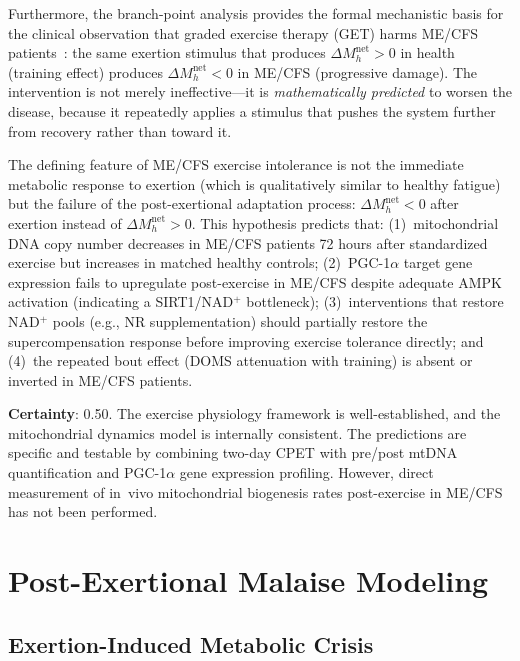 Furthermore, the branch-point analysis provides the formal mechanistic basis for the clinical observation that graded exercise therapy (GET) harms ME/CFS patients~\cite{Geraghty2019GET}: the same exertion stimulus that produces $\Delta M_h^{\text{net}} > 0$ in health (training effect) produces $\Delta M_h^{\text{net}} < 0$ in ME/CFS (progressive damage). The intervention is not merely ineffective---it is \emph{mathematically predicted} to worsen the disease, because it repeatedly applies a stimulus that pushes the system further from recovery rather than toward it.

\begin{hypothesis}
\label{hyp:supercompensation-failure}
The defining feature of ME/CFS exercise intolerance is not the immediate metabolic response to exertion (which is qualitatively similar to healthy fatigue) but the failure of the post-exertional adaptation process: $\Delta M_h^{\text{net}} < 0$ after exertion instead of $\Delta M_h^{\text{net}} > 0$. This hypothesis predicts that: (1)~mitochondrial DNA copy number decreases in ME/CFS patients 72 hours after standardized exercise but increases in matched healthy controls; (2)~PGC-1$\alpha$ target gene expression fails to upregulate post-exercise in ME/CFS despite adequate AMPK activation (indicating a SIRT1/NAD$^+$ bottleneck); (3)~interventions that restore NAD$^+$ pools (e.g., NR supplementation) should partially restore the supercompensation response before improving exercise tolerance directly; and (4)~the repeated bout effect (DOMS attenuation with training) is absent or inverted in ME/CFS patients.

\textbf{Certainty}: 0.50. The exercise physiology framework is well-established, and the mitochondrial dynamics model is internally consistent. The predictions are specific and testable by combining two-day CPET with pre/post mtDNA quantification and PGC-1$\alpha$ gene expression profiling. However, direct measurement of in~vivo mitochondrial biogenesis rates post-exercise in ME/CFS has not been performed.
\end{hypothesis}

\section{Post-Exertional Malaise Modeling}
\label{sec:pem-modeling}

\subsection{Exertion-Induced Metabolic Crisis}
\label{sec:exertion-crisis}


